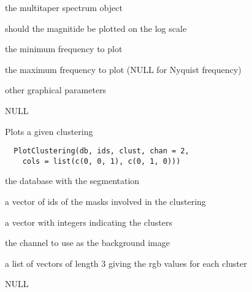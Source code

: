 \documentclass[a4paper]{book}
\begin{document}
%
\begin{Arguments}
\begin{ldescription}
\item[\code{spect}] the multitaper spectrum object

\item[\code{maglog}] should the magnitide be plotted on the log
scale

\item[\code{minfreq}] the minimum frequency to plot

\item[\code{maxfreq}] the maximum frequency to plot (NULL for
Nyquist frequency)

\item[\code{...}] other graphical parameters
\end{ldescription}
\end{Arguments}
%
\begin{Value}
NULL
\end{Value}
%
\begin{Description}\relax
Plots a given clustering
\end{Description}
%
\begin{Usage}
\begin{verbatim}
  PlotClustering(db, ids, clust, chan = 2,
    cols = list(c(0, 0, 1), c(0, 1, 0)))
\end{verbatim}
\end{Usage}
%
\begin{Arguments}
\begin{ldescription}
\item[\code{db}] the database with the segmentation

\item[\code{ids}] a vector of ids of the masks involved in the
clustering

\item[\code{clust}] a vector with integers indicating the
clusters

\item[\code{chan}] the channel to use as the background image

\item[\code{cols}] a list of vectors of length 3 giving the rgb
values for each cluster
\end{ldescription}
\end{Arguments}
%
\begin{Value}
NULL
\end{Value}
\end{document}
